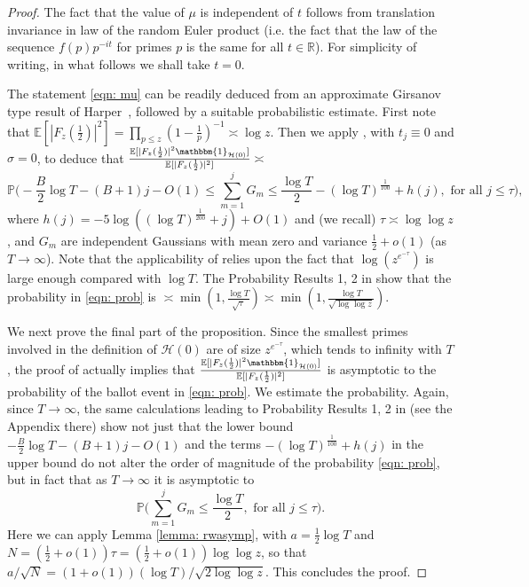 \documentclass[12pt, notitlepage]{amsart}
\numberwithin{equation}{section}
\def\R{\mathbb R}
\def\P{\mathbb P}
\def\E{\mathbb E}
\theoremstyle{remark}
\theoremstyle{definition}
\theoremstyle{remark}
\numberwithin{equation}{section}
\begin{document}
 \begin{proof}%
The fact that the value of $\mu$ is independent of $t$ follows from translation invariance in law of the random Euler product (i.e. the fact that the law of the sequence $f(p)p^{-it}$ 
for primes $p$ is the same for all $t \in \R$). For simplicity of writing, in what follows we shall take $t=0$. 

The statement \eqref{eqn: mu} can be readily deduced from an approximate Girsanov type result of Harper~\cite[Lemma 4]{HarperLow}, followed by a suitable probabilistic estimate. First note that $\E[|F_z(\frac 12)|^{2}] = \prod_{p \le z}(1 - \frac{1}{p})^{-1} \asymp \log z$. Then we apply \cite[Lemma 4]{HarperLow}, with $t_j \equiv 0$ and $\sigma = 0$, to deduce that $\frac{\E[|F_z(\frac 12)|^2 \mathbbm{1}_{\mathcal{H}(0)}]}{\E[|F_z(\frac12)|^{2}]} \asymp $
\begin{equation}\label{eqn: prob}
   \P \Big( -\frac{B}{2}\log T - (B+1)j -O(1) \le \sum_{m=1}^{j}G_m \le \frac{\log T}{2} - (\log T)^{\frac{1}{100}} + h(j), \text{ for all } j\le \tau \Big), 
\end{equation}
where $h(j) = -5\log ((\log T)^{\frac 1{200}} + j) + O(1)$  and (we recall) $\tau \asymp \log \log z$, and $G_m$ are independent Gaussians with mean zero and variance $\frac 12 + o(1)$ (as $T \rightarrow \infty$). Note that the applicability of \cite[Lemma 4]{HarperLow} relies upon the fact that $\log(z^{e^{-\tau}})$ is large enough compared with $\log T$. The Probability Results 1, 2 in \cite{HarperLow} show that the probability in \eqref{eqn: prob} is $\asymp \min (1, \frac{\log T}{\sqrt{\tau}}) \asymp \min (1, \frac{\log T}{\sqrt{\log \log z}})$.

We next prove the final part of the proposition. 
 Since the smallest primes involved in the definition of $\mathcal{H}(0)$ are of size $z^{e^{-\tau}}$, which tends to infinity with $T$, the proof of \cite[Lemma 4]{HarperLow} actually implies that $\frac{\E[|F_z(\frac 12)|^2 \mathbbm{1}_{\mathcal{H}(0)}]}{\E[|F_z(\frac 12)|^{2}]} $ is asymptotic to the probability of the ballot event in \eqref{eqn: prob}. We estimate the probability. Again, since $T \rightarrow \infty$, the same calculations leading to Probability Results 1, 2 in \cite{HarperLow} (see the Appendix there) show not just that the lower bound $ -\frac{B}{2}\log T - (B+1)j -O(1)$ and the terms $- (\log T)^{\frac 1{100}} + h(j)$ in the upper bound do not alter the order of magnitude of the probability \eqref{eqn: prob}, but in fact that as $T \rightarrow \infty$ it is asymptotic to
$$
\P \Big( \sum_{m=1}^{j}G_m \le \frac{\log T}{2}, \text{  for all  }  j\le \tau \Big) . 
$$
Here we can apply Lemma \ref{lemma: rwasymp}, with $a = \frac 12\log T$ and $N = (\frac 12 + o(1))\tau = (\frac 12 + o(1))\log\log z$, so that $a/\sqrt{N} = (1+o(1))(\log T)/\sqrt{2\log\log z}$. This concludes the proof.
  \end{proof}
 
\end{document}

